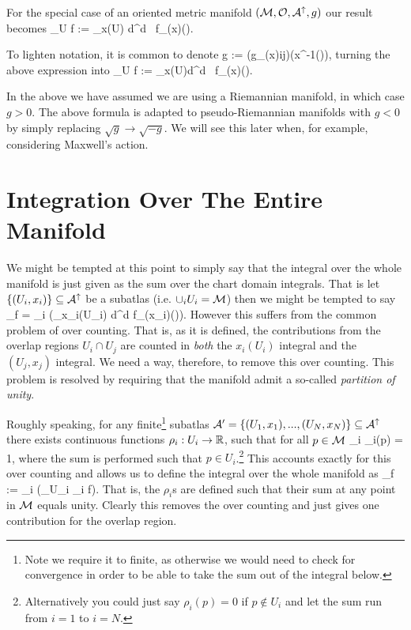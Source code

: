 For the special case of an oriented metric manifold $(\mathcal{M},\mathcal{O},\mathcal{A}^{\uparrow},g)$ our result becomes 
\bse 
    \int_U f := \int_{x(U)} d^d\a {} \, f_{(x)}(\a).
\ese 

\bnn 
    To lighten notation, it is common to denote 
    \bse 
        g := \det\big(g_{(x)ij}\big)\big(x^{-1}(\a)\big),
    \ese 
    turning the above expression into 
    \bse 
        \int_U f := \int_{x(U)}d^d\a {} \, f_{(x)}(\a). 
    \ese 
\enn

\br 
    In the above we have assumed we are using a Riemannian manifold, in which case $g>0$. The above formula is adapted to pseudo-Riemannian manifolds with $g<0$ by simply replacing $\sqrt{g} \to \sqrt{-g}$. We will see this later when, for example, considering Maxwell's action. 
\er 

\section{Integration Over The Entire Manifold}

We might be tempted at this point to simply say that the integral over the whole manifold is just given as the sum over the chart domain integrals. That is let $\{(U_i,x_i)\}\subseteq\mathcal{A}^{\uparrow}$ be a subatlas (i.e. $\cup_i U_i = \mathcal{M}$) then we might be tempted to say 
\bse 
    \int_{\cM}f = \sum_i \bigg(\int_{x_i(U_i)} d^d\a {} f_{(x_i)}(\a)\bigg).
\ese 
However this suffers from the common problem of over counting. That is, as it is defined, the contributions from the overlap regions $U_i\cap U_j$ are counted in \textit{both} the $x_i(U_i)$ integral and the $(U_j,x_j)$ integral. We need a way, therefore, to remove this over counting. This problem is resolved by requiring that the manifold admit a so-called \textit{partition of unity}.

Roughly speaking, for any finite\footnote{Note we require it to finite, as otherwise we would need to check for convergence in order to be able to take the sum out of the integral below.} subatlas $\mathcal{A}' = \{ (U_1,x_1),...,(U_N,x_N) \} \subseteq \mathcal{A}^{\uparrow}$ there exists continuous functions $\rho_i : U_i \to \mathbb{R}$, such that for all $p\in\mathcal{M}$ 
\bse 
    \sum_i \rho_i(p) = 1,
\ese
where the sum is performed such that $p\in U_i$.\footnote{Alternatively you could just say $\rho_i(p) = 0$ if $p\notin U_i$ and let the sum run from $i=1$ to $i=N$.} This accounts exactly for this over counting and allows us to define the integral over the whole manifold as
\bse 
    \int_{\cM}f := \sum_i \bigg(\int_{U_i} \rho_i \cdot f\bigg).
\ese 
That is, the $\rho_i$s are defined such that their sum at any point in $\mathcal{M}$ equals unity. Clearly this removes the over counting and just gives one contribution for the overlap region.

